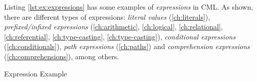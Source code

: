 Listing \ref{lst:ex:expressions} has some examples of \emph{expressions} in CML.
As shown, there are different types of expressions:
\emph{literal values} (\ref{ch:literals}),
\emph{prefixed/infixed expressions}
(\ref{ch:arithmetic}, \ref{ch:logical}, \ref{ch:relational}, \ref{ch:referential},
\ref{ch:type-casting}, \ref{ch:type-casting}),
\emph{conditional expressions} (\ref{ch:conditionals}),
\emph{path expressions} (\ref{ch:paths})
and \emph{comprehension expressions} (\ref{ch:comprehensions}),
among others.

\begin{code}
\verbatimfont{\small}

\caption{Expression Example}
\label{lst:ex:expressions}
\end{code}
